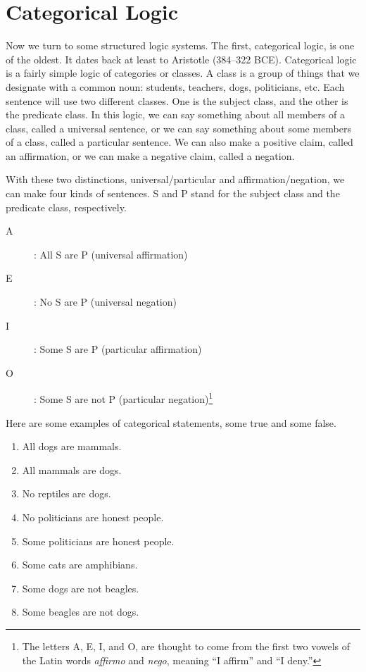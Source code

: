 \documentclass[../logic-text.tex]{subfiles}
\begin{document}
\chapter{Categorical Logic}
\label{chap:categorical}




Now we turn to some structured logic systems. The first, categorical logic, is one of the oldest. It dates back at least to Aristotle (384--322 BCE). Categorical logic is a fairly simple logic of categories or classes. A class is a group of things that we designate with a common noun: students, teachers, dogs, politicians, etc. Each sentence will use two different classes. One is the subject class, and the other is the predicate class. In this logic, we can say something about all members of a class, called a universal sentence, or we can say something about some members of a class, called a particular sentence. We can also make a positive claim, called an affirmation, or we can make a negative claim, called a negation.

With these two distinctions, universal/particular and affirmation/negation, we can make four kinds of sentences. S and P stand for the subject class and the predicate class, respectively.

\begin{description}
\item[A]: All S are P (universal affirmation)
\item[E]: No S are P (universal negation)
\item[I]: Some S are P (particular affirmation)
\item[O]: Some S are not P (particular negation)\footnote{The letters A, E, I, and O, are thought to come from the first two vowels of the Latin words \emph{affirmo} and \emph{nego}, meaning \enquote{I affirm} and \enquote{I deny.}
} 
\end{description}

Here are some examples of categorical statements, some true and some false.

\begin{enumerate}
\item All dogs are mammals.
\item All mammals are dogs.
\item No reptiles are dogs.
\item No politicians are honest people.
\item Some politicians are honest people.
\item Some cats are amphibians.
\item Some dogs are not beagles.
\item Some beagles are not dogs.
\end{enumerate}
\end{document}
